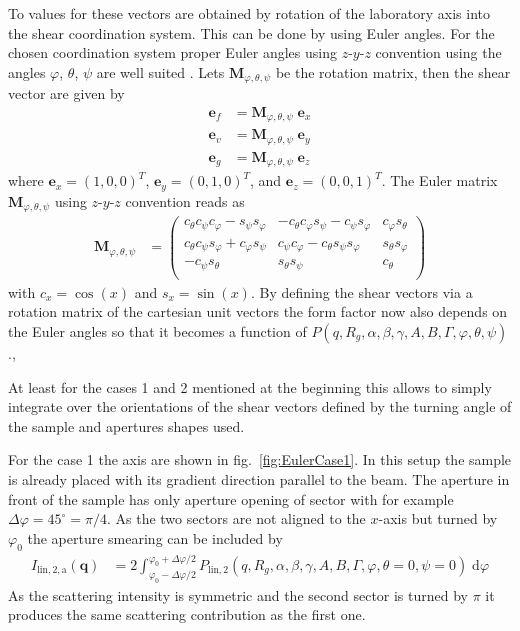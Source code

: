 To values for these vectors are obtained by rotation of the laboratory axis into the shear coordination system. This can be done by using Euler angles. For the chosen coordination system proper Euler angles using $z$-$y$-$z$ convention using the angles $\varphi$, $\theta$, $\psi$ are well suited \cite{reference.wolfram_2022_eulerangles}. Lets $\mathbf{M}_{\varphi,\theta,\psi}$ be the rotation matrix, then the shear vector are given by
\begin{align}\label{eq:rotated_shear_vectors}
  \mathbf{e}_f &= \mathbf{M}_{\varphi,\theta,\psi} \; \mathbf{e}_x \\
  \mathbf{e}_v &= \mathbf{M}_{\varphi,\theta,\psi} \; \mathbf{e}_y \\
  \mathbf{e}_g &= \mathbf{M}_{\varphi,\theta,\psi} \; \mathbf{e}_z
\end{align}
where $\mathbf{e}_x=(1,0,0)^T$, $\mathbf{e}_y=(0,1,0)^T$, and $\mathbf{e}_z=(0,0,1)^T$. The Euler matrix $\mathbf{M}_{\varphi,\theta,\psi}$ using $z$-$y$-$z$ convention reads as
\begin{align}
\mathbf{M}_{\varphi,\theta,\psi} &=
\left(
\begin{array}{ccc}
 c_{\theta } c_{\psi } c_{\varphi }-s_{\psi } s_{\varphi } & -c_{\theta } c_{\varphi } s_{\psi }-c_{\psi } s_{\varphi } & c_{\varphi } s_{\theta } \\
 c_{\theta } c_{\psi } s_{\varphi }+c_{\varphi } s_{\psi } & c_{\psi } c_{\varphi }-c_{\theta } s_{\psi } s_{\varphi } & s_{\theta } s_{\varphi } \\
 -c_{\psi } s_{\theta } & s_{\theta } s_{\psi } & c_{\theta } \\
\end{array}
\right)
\end{align}
with $c_x=\cos(x)$ and $s_x=\sin(x)$.
By defining the shear vectors via a rotation matrix of the cartesian unit vectors the form factor now also depends on the Euler angles so that it becomes a function of $P(q,R_g,\alpha,\beta,\gamma,A,B,\mathit{\Gamma},\varphi,\theta,\psi)$.,

At least for the cases 1 and 2 mentioned at the beginning this allows to simply integrate over the orientations of the shear vectors defined by the turning angle of the sample and apertures shapes used.

For the case 1 the axis are shown in fig.\ \ref{fig:EulerCase1}. In this setup the sample is already placed with its gradient direction parallel to the beam. The aperture in front of the sample has only aperture opening of sector with for example $\Delta\varphi=45^\circ=\pi/4$. As the two sectors are not aligned to the $x$-axis but turned by $\varphi_0$ the aperture smearing can be included by
\begin{align}\label{eq:case1}
  I_{\mathrm{lin},2,\mathrm{a}}(\mathbf{q}) & = 2\int_{\varphi_0-\Delta\varphi/2}^{\varphi_0+\Delta\varphi/2} P_\mathrm{lin,2}(q,R_g,\alpha,\beta,\gamma,A,B,\mathit{\Gamma},\varphi,\theta=0,\psi=0) \;\mathrm{d}\varphi
\end{align}
As the scattering intensity is symmetric and the second sector is turned by $\pi$ it produces the same scattering contribution as the first one.

